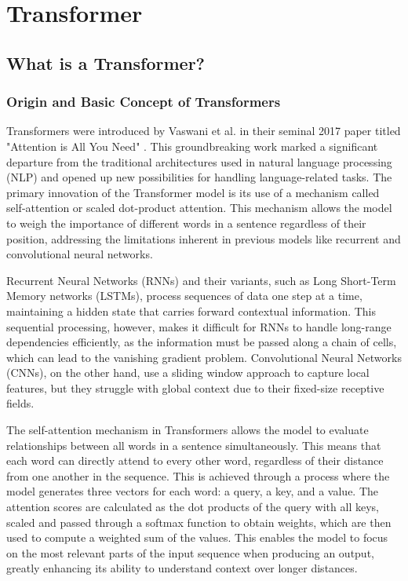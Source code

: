 \chapter{Transformer}
\pagestyle{esitscCD}

\section{What is a Transformer?}

\subsection{Origin and Basic Concept of Transformers}

Transformers were introduced by Vaswani et al. in their seminal 2017 paper titled "Attention is All You Need" \cite{vaswani2023attention}. This groundbreaking work marked a significant departure from the traditional architectures used in natural language processing (NLP) and opened up new possibilities for handling language-related tasks. The primary innovation of the Transformer model is its use of a mechanism called self-attention or scaled dot-product attention. This mechanism allows the model to weigh the importance of different words in a sentence regardless of their position, addressing the limitations inherent in previous models like recurrent and convolutional neural networks.

Recurrent Neural Networks (RNNs) and their variants, such as Long Short-Term Memory networks (LSTMs), process sequences of data one step at a time, maintaining a hidden state that carries forward contextual information. This sequential processing, however, makes it difficult for RNNs to handle long-range dependencies efficiently, as the information must be passed along a chain of cells, which can lead to the vanishing gradient problem. Convolutional Neural Networks (CNNs), on the other hand, use a sliding window approach to capture local features, but they struggle with global context due to their fixed-size receptive fields.

The self-attention mechanism in Transformers allows the model to evaluate relationships between all words in a sentence simultaneously. This means that each word can directly attend to every other word, regardless of their distance from one another in the sequence. This is achieved through a process where the model generates three vectors for each word: a query, a key, and a value. The attention scores are calculated as the dot products of the query with all keys, scaled and passed through a softmax function to obtain weights, which are then used to compute a weighted sum of the values. This enables the model to focus on the most relevant parts of the input sequence when producing an output, greatly enhancing its ability to understand context over longer distances.

